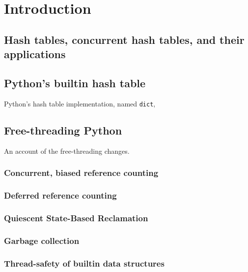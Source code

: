 \chapter{Introduction}\label{ch:introduction}


\section{Hash tables, concurrent hash tables, and their applications}\label{sec:hash-tables}

\cite{art-mp}

\section{Python's builtin hash table}\label{sec:dict-intro}

Python's hash table implementation, named \texttt{dict}, 

\cite{hettinger-dict}
\cite{dict-notes}
\cite{dict-comment-design}
\cite{dict-comment-hash}

\section{Free-threading Python}\label{sec:free-threading}

An account of the free-threading changes.

\cite{dabeaz-gil}
\cite{gross-doc}
\cite{mimalloc}

\subsection{Concurrent, biased reference counting}\label{subsec:concurrent-biased-reference-counting}

\cite{biased-refcounting}

\subsection{Deferred reference counting}\label{subsec:deferred-reference-counting}

\cite{deferred-refcounting}

\subsection{Quiescent State-Based Reclamation}\label{subsec:qsbr}

\cite{qsbr}

\subsection{Garbage collection}\label{subsec:python-gc}

\cite{pep703}

\subsection{Thread-safety of builtin data structures}\label{subsec:thread-safety-of-builtin-data-structures}

\cite[\S Container Thread-Safety]{pep703}
